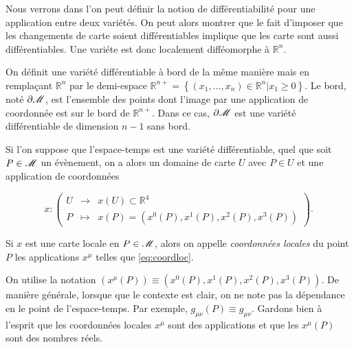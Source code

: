 \documentclass[a4paper,11pt]{report}
\begin{document}
            \begin{rmk}
                 Nous verrons dans l'on peut définir la notion de différentiabilité  pour une application entre deux variétés. On peut alors montrer que le fait d'imposer que les changements de carte soient différentiables implique que les carte sont aussi différentiables. Une variéte est donc localement difféomorphe à $\mathbb{R}^n$.
            \end{rmk}
            
            \begin{rmk}
                On définit une variété différentiable à bord de la même manière mais en remplaçant $\mathbb{R}^n$ par le demi-espace $\mathbb{R}^{n+}=\left\{(x_1,\dots,x_n)\in\mathbb{R}^n|x_1\geq 0\right\}$. Le bord, noté $\partial\mathscr{M}$, est l'ensemble des points dont l'image par une application de coordonnée est sur le bord de $\mathbb{R}^{n+}$. Dans ce cas, $\partial\mathscr{M}$ est une variété différentiable de dimension $n-1$ sans bord.
            \end{rmk}
            
            Si l'on suppose que l'espace-temps est une variété différentiable, quel que soit $P\in\mathscr{M}$ un évènement, on a alors un domaine de carte $U$ avec $P\in U$ et une application de coordonnées
            
            \begin{equation}\label{eq:coordloc}
            x:\left(
            \begin{array}{ccc}
                U & \longrightarrow & x(U) \subset \mathbb{R}^4  \\
                P & \longmapsto & x(P) = (x^0(P), x^1(P) , x^2(P), x^3(P))
            \end{array}
            \right).
            \end{equation}
            
            \begin{defn}
                Si $x$ est une carte locale en $P\in\mathscr{M}$, alors on appelle \textit{coordonnées locales} du point $P$ les applications $x^\mu$ telles que \ref{eq:coordloc}.
            \end{defn}
            
            On utilise la notation $(x^\mu(P)) \equiv (x^0(P),x^1(P),x^2(P),x^3(P))$. De manière générale, lorsque que le contexte est clair, on ne note pas la dépendance en le point de l'espace-temps. Par exemple, $g_{\mu\nu}(P)\equiv g_{\mu\nu}$. Gardons bien à l'esprit que les coordonnées locales $x^\mu$ sont des applications et que les $x^\mu(P)$ sont des nombres réels. 
            
\end{document}
